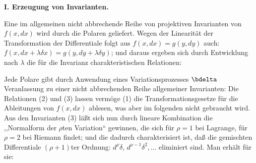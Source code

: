 \begin{center}
\textbf{I. Erzeugung von Invarianten.}
\end{center}

Eine im allgemeinen nicht abbrechende Reihe von projektiven Invarianten
von \(f(x,dx)\) wird durch die Polaren geliefert. Wegen der Linearität
der Transformation der Differentiale folgt aus
\(f(x,dx)=g(y,dy)\) auch:
\(f(x,dx+\lambda\delta x)=g(y,dy+\lambda\delta y)\); und daraus ergeben
sich durch Entwicklung nach \(\lambda\) die für die Invarianz
charakteristischen Relationen:

Jede Polare gibt durch Anwendung eines Variationsprozesses \(\bdelta\)
Veranlassung zu einer nicht abbrechenden Reihe allgemeiner Invarianten:
Die Relationen (2) und (3) lassen vermöge (1) die Transformationsgesetze
für die Ableitungen von \(f(x,dx)\) ablesen, was aber im folgenden
nicht gebraucht wird. Aus den Invarianten (3) läßt sich nun durch
lineare Kombination die ,,Normalform der \(\rho\)ten Variation``
gewinnen, die sich für \(\rho=1\) bei Lagrange, für \(\rho=2\) bei
Riemann findet; und die dadurch charakterisiert ist, daß die gemischten
Differentiale \((\rho+1)\)ter Ordnung: \(d^\rho\delta\),
\(d^{\rho-1}\delta^2,\ldots\) eliminiert sind. Man erhält für sie:

